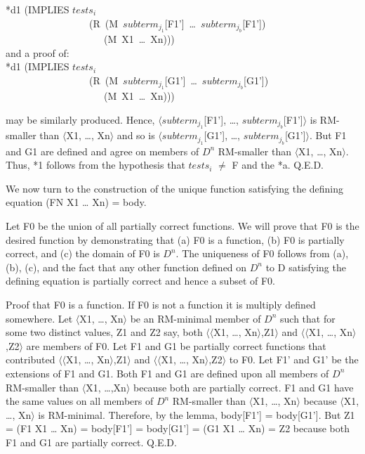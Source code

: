 \documentclass[10pt]{book}
\newenvironment{pubasis}{\begin{flushleft}}{\end{flushleft}}
\begin{document}
\begin{pubasis}
*d1	(IMPLIES $tests_{i}$\\
~~~~~~~~~~~~~~~~~(R~(M~$subterm_{j_{1}}$[F1']~\ldots{}~$subterm_{j_{b}}$[F1'])\\
~~~~~~~~~~~~~~~~~~~~(M~X1~\ldots{}~Xn)))\\

and a proof of:\\

*d1	(IMPLIES $tests_{i}$\\
~~~~~~~~~~~~~~~~~(R~(M~$subterm_{j_{1}}$[G1']~\ldots{}~$subterm_{j_{b}}$[G1'])\\
~~~~~~~~~~~~~~~~~~~~(M~X1~\ldots{}~Xn)))\\
\end{pubasis}
may be similarly produced.  Hence,
$\langle subterm_{j_{1}}$[F1'], \ldots{}, $subterm_{j_{b}}$[F1']$\rangle$
is RM-smaller than $\langle$X1, \ldots{}, Xn$\rangle$ and so is
$\langle subterm_{j_{1}}$[G1'], \ldots{}, $subterm_{j_{b}}$[G1']$\rangle$.
But F1 and G1 are defined and agree on members of $D^{n}$ RM-smaller
than $\langle$X1, \ldots{}, Xn$\rangle$.  Thus, *1 follows from the hypothesis that
$tests_{i}$ $\neq$ F and the *a.  Q.E.D.

We now turn to the construction of the unique function satisfying
the defining equation (FN X1 \ldots{} Xn) = body.

Let F0 be the union of all partially correct functions.  We will prove
that F0 is the desired function by demonstrating that (a) F0 is a function,
(b) F0 is partially correct, and (c) the domain of F0 is $D^{n}$.
The uniqueness of F0 follows from (a), (b), (c), and the fact
that any other function defined on $D^{n}$ to D satisfying the defining
equation is partially correct and hence a subset of F0.

Proof that F0 is a function.  If F0 is not a function it is
multiply defined somewhere.  Let $\langle$X1, \ldots{}, Xn$\rangle$ be an RM-minimal member
of $D^{n}$ such that for some two distinct values, Z1 and Z2 say,
both $\langle \langle$X1, \ldots{}, Xn$\rangle$,Z1$\rangle$ and $\langle \langle$X1, \ldots{}, Xn$\rangle$,Z2$\rangle$ are members of F0.
Let F1 and G1 be partially correct functions that contributed
$\langle \langle$X1, \ldots{}, Xn$\rangle$,Z1$\rangle$ and $\langle \langle$X1, \ldots{}, Xn$\rangle$,Z2$\rangle$ to F0.  Let F1' and G1'
be the extensions of F1 and G1.  Both F1 and G1 are defined
upon all members of $D^{n}$ RM-smaller than $\langle$X1, \ldots{},Xn$\rangle$ because both
are partially correct.  F1 and G1 have the same values
on all members of $D^{n}$ RM-smaller than $\langle$X1, \ldots{}, Xn$\rangle$ because $\langle$X1, \ldots{}, Xn$\rangle$
is RM-minimal.  Therefore, by the lemma, body[F1'] = body[G1'].
But Z1 = (F1 X1 \ldots{} Xn) = body[F1'] = body[G1'] = (G1 X1 \ldots{} Xn) = Z2
because both F1 and G1 are partially correct.  Q.E.D.
\end{document}
